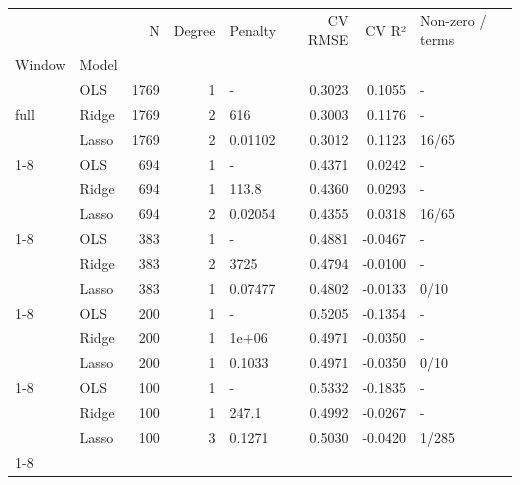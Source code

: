 \begin{tabular}{llrrlrrl}
\toprule
 &  & N & Degree & Penalty & CV RMSE & CV R² & Non-zero / terms \\
Window & Model &  &  &  &  &  &  \\
\midrule
\multirow[t]{3}{*}{full} & OLS & 1769 & 1 & - & 0.3023 & 0.1055 & - \\
 & Ridge & 1769 & 2 & 616 & 0.3003 & 0.1176 & - \\
 & Lasso & 1769 & 2 & 0.01102 & 0.3012 & 0.1123 & 16/65 \\
\cline{1-8}
\multirow[t]{3}{*}{h} & OLS & 694 & 1 & - & 0.4371 & 0.0242 & - \\
 & Ridge & 694 & 1 & 113.8 & 0.4360 & 0.0293 & - \\
 & Lasso & 694 & 2 & 0.02054 & 0.4355 & 0.0318 & 16/65 \\
\cline{1-8}
\multirow[t]{3}{*}{h/2} & OLS & 383 & 1 & - & 0.4881 & -0.0467 & - \\
 & Ridge & 383 & 2 & 3725 & 0.4794 & -0.0100 & - \\
 & Lasso & 383 & 1 & 0.07477 & 0.4802 & -0.0133 & 0/10 \\
\cline{1-8}
\multirow[t]{3}{*}{n200} & OLS & 200 & 1 & - & 0.5205 & -0.1354 & - \\
 & Ridge & 200 & 1 & 1e+06 & 0.4971 & -0.0350 & - \\
 & Lasso & 200 & 1 & 0.1033 & 0.4971 & -0.0350 & 0/10 \\
\cline{1-8}
\multirow[t]{3}{*}{n100} & OLS & 100 & 1 & - & 0.5332 & -0.1835 & - \\
 & Ridge & 100 & 1 & 247.1 & 0.4992 & -0.0267 & - \\
 & Lasso & 100 & 3 & 0.1271 & 0.5030 & -0.0420 & 1/285 \\
\cline{1-8}
\bottomrule
\end{tabular}
